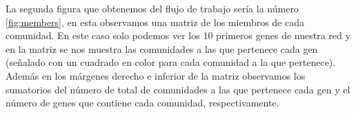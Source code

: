 \begin{minipage}{\linewidth}
	\label{fig:dendrogram}
\end{minipage}

\begin{spacing}{1}
La segunda figura que obtenemos del flujo de trabajo sería la número \ref{fig:members}, en esta observamos una matriz de los miembros de cada comunidad. En este caso solo podemos ver los 10 primeros genes de nuestra red y en la matriz se nos muestra las comunidades a las que pertenece cada gen (señalado con un cuadrado en color para cada comunidad a la que pertenece). Además en los márgenes derecho e inferior de la matriz observamos los sumatorios del número de total de comunidades a las que pertenece cada gen y el número de genes que contiene cada comunidad, respectivamente.
\end{spacing}

\begin{minipage}{\linewidth}
	\label{fig:members}
\end{minipage}

